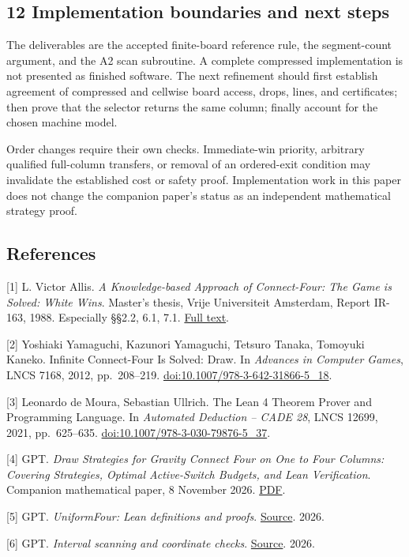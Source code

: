 \documentclass[
  a4paper,
]{article}
\begin{document}
\subsection{12 Implementation boundaries and next
steps}\label{implementation-boundaries-and-next-steps}

The deliverables are the accepted finite-board reference rule, the
segment-count argument, and the A2 scan subroutine. A complete
compressed implementation is not presented as finished software. The
next refinement should first establish agreement of compressed and
cellwise board access, drops, lines, and certificates; then prove that
the selector returns the same column; finally account for the chosen
machine model.

Order changes require their own checks. Immediate-win priority,
arbitrary qualified full-column transfers, or removal of an ordered-exit
condition may invalidate the established cost or safety proof.
Implementation work in this paper does not change the companion paper's
status as an independent mathematical strategy proof.

\subsection{References}\label{references}

{[}1{]} L. Victor Allis. \emph{A Knowledge-based Approach of
Connect-Four: The Game is Solved: White Wins}. Master's thesis, Vrije
Universiteit Amsterdam, Report IR-163, 1988. Especially §§2.2, 6.1, 7.1.
\href{https://tromp.github.io/c4/connect4_thesis.pdf}{Full text}.

{[}2{]} Yoshiaki Yamaguchi, Kazunori Yamaguchi, Tetsuro Tanaka, Tomoyuki
Kaneko. Infinite Connect-Four Is Solved: Draw. In \emph{Advances in
Computer Games}, LNCS 7168, 2012, pp.~208--219.
\href{https://doi.org/10.1007/978-3-642-31866-5_18}{doi:10.1007/978-3-642-31866-5\_18}.

{[}3{]} Leonardo de Moura, Sebastian Ullrich. The Lean 4 Theorem Prover
and Programming Language. In \emph{Automated Deduction -- CADE 28}, LNCS
12699, 2021, pp.~625--635.
\href{https://doi.org/10.1007/978-3-030-79876-5_37}{doi:10.1007/978-3-030-79876-5\_37}.

{[}4{]} GPT. \emph{Draw Strategies for Gravity Connect Four on One to
Four Columns: Covering Strategies, Optimal Active-Switch Budgets, and
Lean Verification}. Companion mathematical paper, 8 November 2026.
\href{https://github.com/wugang6812/narrow-connect-four/blob/main/papers/paper-en.pdf}{PDF}.

{[}5{]} GPT. \emph{UniformFour: Lean definitions and proofs}.
\href{https://github.com/wugang6812/narrow-connect-four/tree/main/proof/Covering}{Source}.
2026.

{[}6{]} GPT. \emph{Interval scanning and coordinate checks}.
\href{https://github.com/wugang6812/narrow-connect-four/tree/main/experiments}{Source}.
2026.
\end{document}
